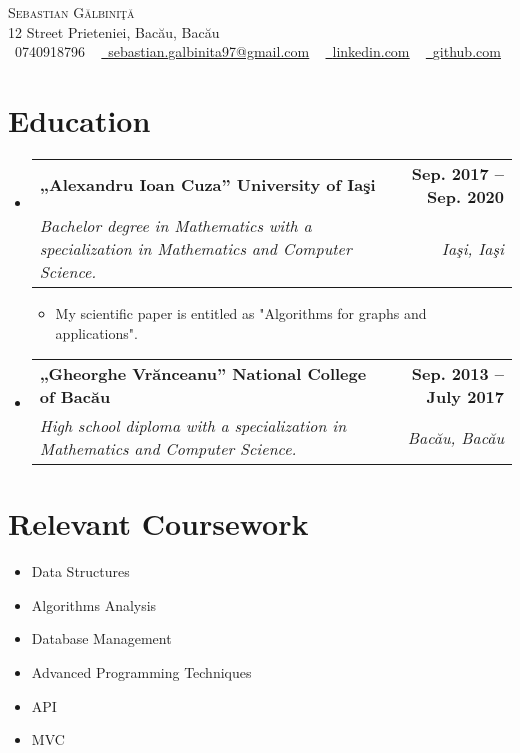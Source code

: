 \documentclass[letterpaper,11pt]{article}
\makeatletter
\newcommand{\resumeSubheading}[4]{
	\vspace{-2pt}\item
	\begin{tabular*}{1.0\textwidth}[t]{l@{\extracolsep{\fill}}r}
		\textbf{#1} & \textbf{\small #2} \\
		\textit{\small#3} & \textit{\small #4} \\
	\end{tabular*}\vspace{-7pt}
}
\newcommand{\resumeSubHeadingListStart}{\begin{itemize}[leftmargin=0.0in, label={}]}
\newcommand{\resumeSubHeadingListEnd}{\end{itemize}}
\makeatother
\begin{document}
	
	
	\begin{center}
		{\Huge \scshape Sebastian G\u albini\c t\u a } \\ \vspace{1pt}
		12 Street Prieteniei, Bac\u au, Bac\u au \\ \vspace{1pt}
		\small \raisebox{-0.1\height}\faPhone\ 0740918796 ~ \href{mailto:sebastian.galbinita97@gmail.com}{\raisebox{-0.2\height}\faEnvelope\  \underline{sebastian.galbinita97@gmail.com}} ~ 
		\href{https://linkedin.com/in/galbinita-sebastian}{\raisebox{-0.2\height}\faLinkedin\ \underline{linkedin.com}}  ~
		\href{https://github.com/GalbinitaSebastian97}{\raisebox{-0.2\height}\faGithub\ \underline{github.com}}
		\vspace{-8pt}
	\end{center}
	
	
	\section{Education}
	\resumeSubHeadingListStart
	\resumeSubheading
	{„Alexandru Ioan Cuza” University of Ia\c si}{Sep. 2017 -- Sep. 2020}
	{Bachelor degree in Mathematics with a specialization in Mathematics and Computer Science.}{Ia\c si, Ia\c si}
	\begin{itemize}[itemsep=-5pt, parsep=6pt]
		\item\small My scientific paper is entitled as "Algorithms for graphs and applications". 	
	\end{itemize}
	\resumeSubheading
	{„Gheorghe Vr\u anceanu” National College of Bac\u au}{Sep. 2013 -- July 2017}
	{High school diploma with a specialization in Mathematics and Computer Science.}{Bac\u au, Bac\u au}
	\resumeSubHeadingListEnd
	
	\section{Relevant Coursework}
	\begin{multicols}{3}
		\begin{itemize}[itemsep=-5pt, parsep=6pt]
			\item\small Data Structures
			\item Algorithms Analysis
			\item Database Management
			\item Advanced Programming Techniques
			\item API
			\item MVC

		\end{itemize}
	\end{multicols}
	\vspace*{2.0\multicolsep}
	
\end{document}
